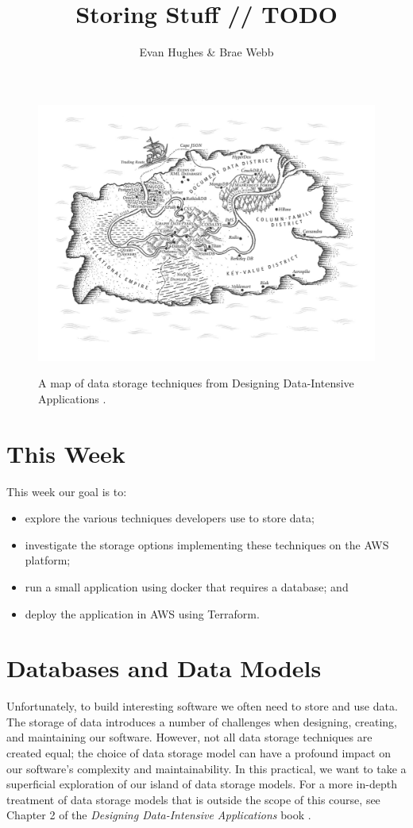 \documentclass{csse4400}
\title{Storing Stuff // TODO}
\author{Evan Hughes \& Brae Webb}
\date{\week{3}}
\begin{document}
\maketitle

\begin{figure}[h]
  \href{https://www.oreilly.com/library/view/designing-data-intensive-applications/9781491903063/ch02.html}{
    \includegraphics[width=\textwidth]{images/databases}
  }
\caption{A map of data storage techniques from Designing Data-Intensive Applications \cite{data-intensive}.}
\end{figure}

\section{This Week}
This week our goal is to:
\begin{itemize}
  \item explore the various techniques developers use to store data;
  \item investigate the storage options implementing these techniques on the AWS platform;
  \item run a small application using docker that requires a database; and
  \item deploy the application in AWS using Terraform.
\end{itemize}

\section{Databases and Data Models}
Unfortunately, to build interesting software we often need to store and use data.
The storage of data introduces a number of challenges when designing, creating, and maintaining our software.
However, not all data storage techniques are created equal;
the choice of data storage model can have a profound impact on our software's complexity and maintainability.
In this practical, we want to take a superficial exploration of our island of data storage models.
For a more in-depth treatment of data storage models that is outside the scope of this course,
see Chapter 2 of the \textit{Designing Data-Intensive Applications} book \cite{data-intensive}.
\end{document}
